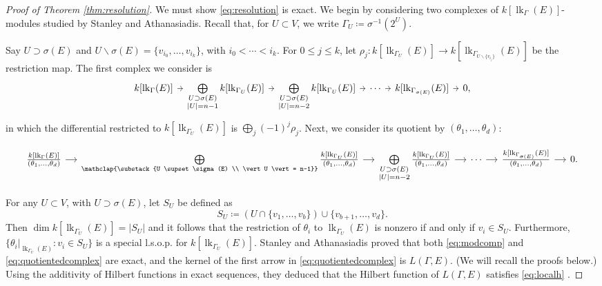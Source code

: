 \documentclass[ALCO, Unicode,published]{cedram}
\DeclareMathOperator{\lk}{lk}
\begin{document}
\begin{proof}[Proof of Theorem \ref{thm:resolution}]
We must show \eqref{eq:resolution} is exact.
 We begin by considering two complexes of $k[\lk_{\Gamma}(E)]$-modules
 studied by Stanley and Athanasiadis. Recall that, for $U \subset V$, we write $\Gamma_U  \coloneqq  \sigma^{-1}(2^U)$.
 
Say $U \supset \sigma(E)$ and $U \smallsetminus \sigma(E) = \{v_{i_0}, \ldots, v_{i_k}\}$, with $i_0 < \cdots < i_k$. For $0 \leq j \leq k$, let $\rho_j \colon k[\lk_{\Gamma_U}(E)] \to k[\lk_{\Gamma_{U \smallsetminus \{v_{i_j}\}}}(E)]$ be the restriction map.  The first complex we consider is 
\small
\begin{equation}\label{eq:modcomp}
\begin{tikzcd}[column sep = tiny]
 k[\lk_{\Gamma}(E)]  \arrow[r] & \bigoplus\limits_{\substack{U \supset \sigma(E)  \\ \vert U \vert = n - 1}} k[\lk_{\Gamma_U}(E)] \arrow[r]  &\bigoplus\limits_{\substack{U \supset \sigma(E)  \\ \vert U \vert = n - 2}}  k[\lk_{\Gamma_U}(E)] \arrow[r]  &\cdots \arrow[r] & k[\lk_{\Gamma_{\sigma(E)}}(E)] \arrow[r] & 0,
\end{tikzcd}
\end{equation}
\normalsize
in which the differential restricted to $k[\lk_{\Gamma_U}(E)]$ is $\bigoplus_j (-1)^j \rho_j$.  Next, we consider its quotient by $(\theta_1,\ldots,\theta_{d})$:

\begin{equation}\label{eq:quotientedcomplex}
\begin{tikzcd}[column sep = small]
 \frac{k[\lk_{\Gamma}(E)]}{(\theta_1, \dotsc, \theta_{d})} \arrow[r] & \bigoplus\limits_{\mathclap{\substack{U \supset \sigma(E)  \\ \vert U \vert = n-1}}} \frac{k[\lk_{\Gamma_{U}}(E)]}{(\theta_1, \dotsc, \theta_{d})} \arrow[r]  & \bigoplus\limits_{\mathcal{\substack{U \supset \sigma(E)  \\ \vert U \vert = n-2}}} \frac{k[\lk_{\Gamma_{U}}(E)]}{(\theta_1, \dotsc, \theta_{d})} \arrow[r] &\cdots \arrow[r] & \frac{k[\lk_{\Gamma_{\sigma(E)}}(E)]}{(\theta_1, \dotsc, \theta_{d})} \arrow[r]  &0.
 \end{tikzcd}
\end{equation}

For any $U \subset V$, with $U \supset \sigma(E)$, let $S_U$ be defined as
\[
S_U  \coloneqq  (U \cap \{v_1, \ldots, v_b\}) \cup \{ v_{b+1}, \ldots, v_{d}\}.
\]
Then $\dim k[\lk_{\Gamma_U}(E)] = |S_U|$ and it follows that the restriction of $\theta_i$ to $\lk_{\Gamma_U}(E)$ is nonzero if and only if $v_i \in S_U$. Furthermore, $\{ \theta_i|_{\lk_{\Gamma_U}(E)} : v_i \in S_U \}$ is a special l.s.o.p. for $k[\lk_{\Gamma_{U}}(E)]$.  Stanley and Athanasiadis proved that both \eqref{eq:modcomp} and \eqref{eq:quotientedcomplex} are exact, and the kernel of the first arrow in \eqref{eq:quotientedcomplex} is $L(\Gamma,E)$. (We will recall the proofs below.) Using the additivity of Hilbert functions in exact sequences, they deduced that the Hilbert function of $L(\Gamma, E)$ satisfies \eqref{eq:localh} \cite{Stanley92, Athanasiadis12}.


\end{proof}
\end{document}
